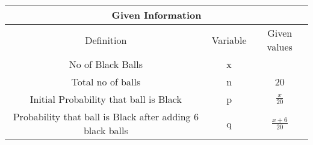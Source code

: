 \begin{tabular}{|c|c|c|}
    \hline
    \multicolumn{3}{|c|}{Given Information} \\
    \hline
    Definition & Variable & Given values \\
    \hline
    No of Black Balls & x &  \\
    \hline
    Total no of balls & n & 20 \\
    \hline
    Initial Probability that ball is Black & p & $\frac{x}{20}$ \\
    \hline
    Probability that ball is Black after adding 6 black balls & q & $\frac{x + 6}{20}$ \\
    \hline
  \end{tabular}